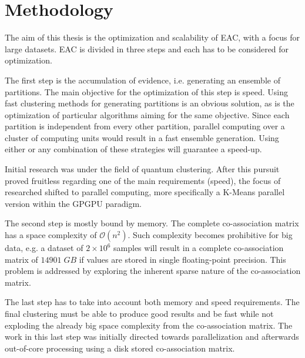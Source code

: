 
\chapter{Methodology}
\label{chapter:methodology}




The aim of this thesis is the optimization and scalability of EAC, with a focus for large datasets.
EAC is divided in three steps and each has to be considered for optimization.

The first step is the accumulation of evidence, i.e. generating an ensemble of partitions.
The main objective for the optimization of this step is speed.
Using fast clustering methods for generating partitions is an obvious solution, as is the optimization of particular algorithms aiming for the same objective.
Since each partition is independent from every other partition, parallel computing over a cluster of computing units would result in a fast ensemble generation.
Using either or any combination of these strategies will guarantee a speed-up.

Initial research was under the field of quantum clustering.
After this pursuit proved fruitless regarding one of the main requirements (speed), the focus of researched shifted to parallel computing, more specifically a K-Means parallel version within the GPGPU paradigm.
	
The second step is mostly bound by memory.
The complete co-association matrix has a space complexity of $\mathcal{O}(n^2)$.
Such complexity becomes prohibitive for big data, e.g. a dataset of $2 \times 10^6$ samples will result in a complete co-association matrix of $14901 \; GB$ if values are stored in single floating-point precision.
This problem is addressed by exploring the inherent sparse nature of the co-association matrix.

The last step has to take into account both memory and speed requirements.
The final clustering must be able to produce good results and be fast while not exploding the already big space complexity from the co-association matrix.
The work in this last step was initially directed towards parallelization and afterwards out-of-core processing using a disk stored co-association matrix.%

